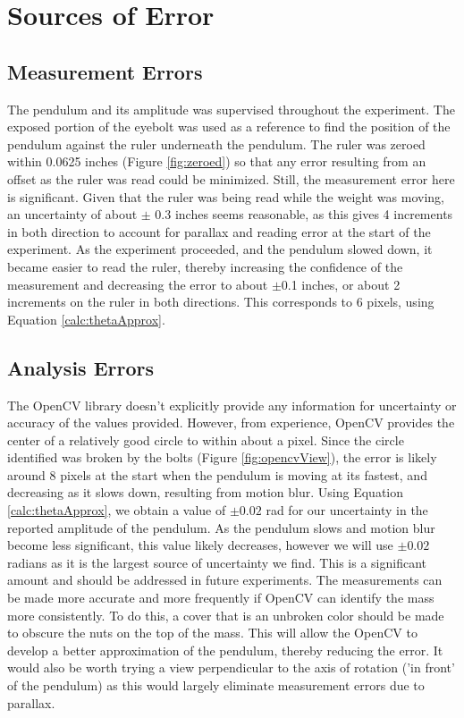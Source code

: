 \documentclass[11pt]{article}
\begin{document}
    \section{Sources of Error}        
        \subsection{Measurement Errors}
        The pendulum and its amplitude was supervised throughout the experiment. The exposed portion of the eyebolt was used as a reference to find the position of the pendulum against the ruler underneath the pendulum. The ruler was zeroed within 0.0625 inches (Figure \ref{fig:zeroed}) so that any error resulting from an offset as the ruler was read could be minimized. Still, the measurement error here is significant. Given that the ruler was being read while the weight was moving, an uncertainty of about $\pm$ 0.3 inches seems reasonable, as this gives 4 increments in both direction to account for parallax and reading error at the start of the experiment. As the experiment proceeded, and the pendulum slowed down, it became easier to read the ruler, thereby increasing the confidence of the measurement and decreasing the error to about $\pm$0.1 inches, or about 2 increments on the ruler in both directions. This corresponds to 6 pixels, using Equation \ref{calc:thetaApprox}.
        
        \subsection{Analysis Errors}\label{SourcesOfError:Analysis}
        The OpenCV library doesn't explicitly provide any information for uncertainty or accuracy of the values provided. However, from experience, OpenCV provides  the center of a relatively good circle to within about a pixel. Since the circle identified was broken by the bolts (Figure \ref{fig:opencvView}), the error is likely around 8 pixels at the start when the pendulum is moving at its fastest, and decreasing as it slows down, resulting from motion blur. Using Equation \ref{calc:thetaApprox}, we obtain a value of $\pm 0.02$ rad for our uncertainty in the reported amplitude of the pendulum. As the pendulum slows and motion blur become less significant, this value likely decreases, however we will use $\pm 0.02$ radians as it is the largest source of uncertainty we find. This is a significant amount and should be addressed in future experiments. The measurements can be made more accurate and more frequently if OpenCV can identify the mass more consistently. To do this, a cover that is an unbroken color should be made to obscure the nuts on the top of the mass. This will allow the OpenCV to develop a better approximation of the pendulum, thereby reducing the error. It would also be worth trying a view perpendicular to the axis of rotation ('in front' of the pendulum) as this would largely eliminate measurement errors due to parallax.
\end{document}
